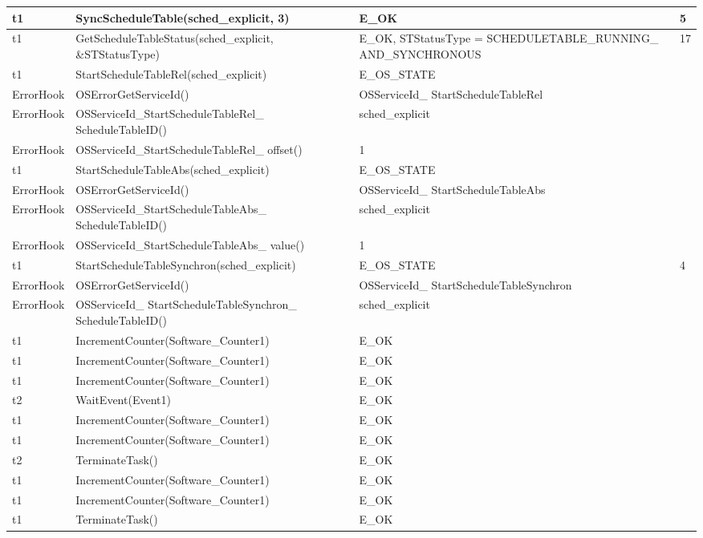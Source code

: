 \documentclass[10pt]{article}
\newlength{\Li}\settowidth{\Li}{Running}
\newlength{\Lii}\setlength{\Lii}{7cm}
\newlength{\Liiii}\setlength{\Liiii}{0.9cm}
\newlength{\Liii}\setlength{\Liii}{\textwidth} \addtolength{\Liii}{-\Li} \addtolength{\Liii}{-\Lii} \addtolength{\Liii}{-\Liiii}
\begin{document}
\begin{supertabular}{|p{\Li}|p{\Lii}|p{\Liii}|p{\Liiii}|}
	t1		& SyncScheduleTable(sched\_explicit, 3)							& E\_OK																	& 5 \\ \hline
	t1		& GetScheduleTableStatus(sched\_explicit, \&STStatusType)			& E\_OK, STStatusType = SCHEDULETABLE\_RUNNING\_ AND\_SYNCHRONOUS		& 17 \\ \hline
	t1		& StartScheduleTableRel(sched\_explicit)						& E\_OS\_STATE															& \\ \hline
	ErrorHook	& OSErrorGetServiceId()										& OSServiceId\_ StartScheduleTableRel											& \\ \hline
	ErrorHook	& OSServiceId\_StartScheduleTableRel\_ ScheduleTableID()			& sched\_explicit															& \\ \hline
	ErrorHook	& OSServiceId\_StartScheduleTableRel\_ offset()					& 1																		& \\ \hline
	t1		& StartScheduleTableAbs(sched\_explicit)						& E\_OS\_STATE															& \\ \hline
	ErrorHook	& OSErrorGetServiceId()										& OSServiceId\_ StartScheduleTableAbs											& \\ \hline
	ErrorHook	& OSServiceId\_StartScheduleTableAbs\_ ScheduleTableID()			& sched\_explicit															& \\ \hline
	ErrorHook	& OSServiceId\_StartScheduleTableAbs\_ value()					& 1																		& \\ \hline
	t1		& StartScheduleTableSynchron(sched\_explicit)					& E\_OS\_STATE															& 4 \\ \hline
	ErrorHook	& OSErrorGetServiceId()										& OSServiceId\_ StartScheduleTableSynchron										& \\ \hline
	ErrorHook	& OSServiceId\_ StartScheduleTableSynchron\_ ScheduleTableID()	& sched\_explicit															& \\ \hline
	t1		& IncrementCounter(Software\_Counter1)						& E\_OK																	& \\ \hline
	t1		& IncrementCounter(Software\_Counter1)						& E\_OK																	& \\ \hline
	t1		& IncrementCounter(Software\_Counter1)						& E\_OK																	& \\ \hline
	t2		& WaitEvent(Event1)											& E\_OK																	& \\ \hline
	t1		& IncrementCounter(Software\_Counter1)						& E\_OK																	& \\ \hline
	t1		& IncrementCounter(Software\_Counter1)						& E\_OK																	& \\ \hline
	t2		& TerminateTask()											& E\_OK																	& \\ \hline
	t1		& IncrementCounter(Software\_Counter1)						& E\_OK																	& \\ \hline
	t1		& IncrementCounter(Software\_Counter1)						& E\_OK																	& \\ \hline
	t1		& TerminateTask()											& E\_OK																	& \\ \hline
	\end{supertabular}\\
	
\end{document}
